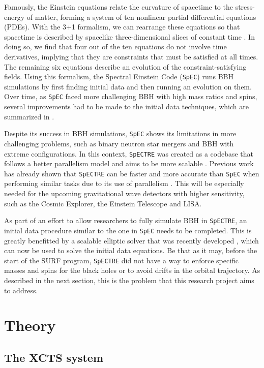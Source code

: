 \documentclass{../document}
\begin{document}
    Famously, the Einstein equations relate the curvature of spacetime to the stress-energy of matter, forming a system of ten nonlinear partial differential equations (PDEs). With the 3+1 formalism, we can rearrange these equations so that spacetime is described by spacelike three-dimensional slices of constant time \cite{Alcubierre}. In doing so, we find that four out of the ten equations do not involve time derivatives, implying that they are constraints that must be satisfied at all times. The remaining six equations describe an evolution of the constraint-satisfying fields. Using this formalism, the Spectral Einstein Code ({\tt SpEC}) \cite{SpEC} runs BBH simulations by first finding initial data and then running an evolution on them. Over time, as {\tt SpEC} faced more challenging BBH with high mass ratios and spins, several improvements had to be made to the initial data techniques, which are summarized in \cite{Serguei}.
    
    Despite its success in BBH simulations, {\tt SpEC} shows its limitations in more challenging problems, such as binary neutron star mergers and BBH with extreme configurations. In this context, {\tt SpECTRE} \cite{SpECTRE} was created as a codebase that follows a better parallelism model and aims to be more scalable \cite{Kidder}. Previous work has already shown that {\tt SpECTRE} can be faster and more accurate than {\tt SpEC} when performing similar tasks due to its use of parallelism \cite{Vu}. This will be especially needed for the upcoming gravitational wave detectors with higher sensitivity, such as the Cosmic Explorer, the Einstein Telescope and LISA.
    
    As part of an effort to allow researchers to fully simulate BBH in {\tt SpECTRE}, an initial data procedure similar to the one in {\tt SpEC} needs to be completed. This is greatly benefitted by a scalable elliptic solver that was recently developed \cite{Vu}, which can now be used to solve the initial data equations. Be that as it may, before the start of the SURF program, {\tt SpECTRE} did not have a way to enforce specific masses and spins for the black holes or to avoid drifts in the orbital trajectory. As described in the next section, this is the problem that this research project aims to address.

  \section{Theory}

    \subsection{The XCTS system}
\end{document}
